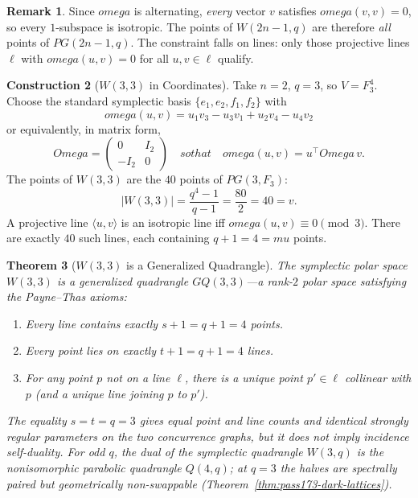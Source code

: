 \documentclass[12pt,a4paper]{article}
\def\mathbb#1{#1}%
\def\mathrm#1{#1}%
\def\textbf#1{#1}%
\def\text#1{#1}%
\def\omega{omega}%
\def\mu{mu}%
\def\Omega{Omega}%
\newtheorem{theorem}{Theorem}[section]
\theoremstyle{definition}
\newtheorem{remark}[theorem]{Remark}
\newtheorem{construction}[theorem]{Construction}
\newcommand{\GQ}{\mathrm{GQ}}
\newcommand{\PG}{\mathrm{PG}}
\newcommand{\FF}{\mathbb{F}}
\begin{document}
\begin{remark}
Since $\omega$ is alternating, \emph{every} vector $v$ satisfies
$\omega(v,v)=0$, so every $1$-subspace is isotropic.
The points of $W(2n{-}1,q)$ are therefore \emph{all} points of
$\PG(2n{-}1,q)$.  The constraint falls on lines:
only those projective lines $\ell$ with $\omega(u,v)=0$ for all
$u,v\in\ell$ qualify.
\end{remark}

\begin{construction}[$W(3,3)$ in Coordinates]
\label{con:w33}
Take $n=2$, $q=3$, so $V = \FF_3^4$.  Choose the standard
symplectic basis $\{e_1,e_2,f_1,f_2\}$ with
\begin{equation}
\omega(u,v) = u_1 v_3 - u_3 v_1 + u_2 v_4 - u_4 v_2
\label{eq:sympl-form}
\end{equation}
or equivalently, in matrix form,
\begin{equation}
\Omega = \begin{pmatrix} 0 & I_2 \\ -I_2 & 0 \end{pmatrix}
\quad\text{so that}\quad
\omega(u,v) = u^{\!\top}\Omega\, v.
\label{eq:omega-matrix}
\end{equation}
The \textbf{points} of $W(3,3)$ are the $40$ points of $\PG(3,\FF_3)$:
\begin{equation}
|W(3,3)| = \frac{q^4-1}{q-1} = \frac{80}{2} = 40 = v.
\end{equation}
A projective line $\langle u,v\rangle$ is an \textbf{isotropic line} iff
$\omega(u,v)\equiv 0 \pmod{3}$.  There are exactly $40$ such lines,
each containing $q+1=4=\mu$ points.
\end{construction}

\begin{theorem}[$W(3,3)$ is a Generalized Quadrangle]
\label{thm:gq}
The symplectic polar space $W(3,3)$ is a generalized quadrangle
$\GQ(3,3)$---a rank-$2$ polar space satisfying the Payne--Thas axioms:
\begin{enumerate}[nosep,label=\upshape(\roman*)]
\item Every line contains exactly $s+1 = q+1 = 4$ points.
\item Every point lies on exactly $t+1 = q+1 = 4$ lines.
\item For any point $p$ not on a line $\ell$, there is a
  \textbf{unique} point $p'\in\ell$ collinear with $p$
  (and a unique line joining $p$ to $p'$).
\end{enumerate}
The equality $s=t=q=3$ gives equal point and line counts and identical
strongly regular parameters on the two concurrence graphs, but it does
\emph{not} imply incidence self-duality.  For odd $q$, the dual of the
symplectic quadrangle $W(3,q)$ is the nonisomorphic parabolic quadrangle
$Q(4,q)$; at $q=3$ the halves are spectrally paired but geometrically
non-swappable (Theorem~\ref{thm:pass173-dark-lattices}).
\end{theorem}
\end{document}
